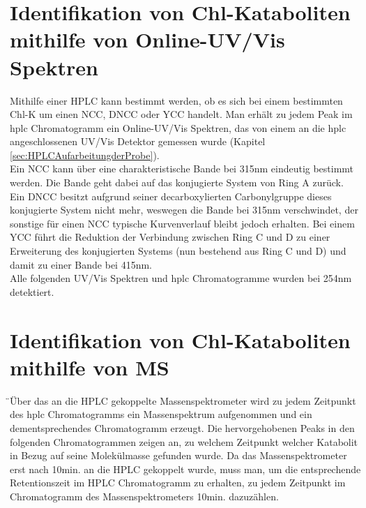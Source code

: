 \section{Identifikation von Chl-Kataboliten mithilfe von Online-UV/Vis Spektren} \label{sec:IdentifikationUVVis}

Mithilfe einer HPLC kann bestimmt werden, ob es sich bei einem bestimmten \gls{Chl-K} um einen \gls{NCC}, \gls{DNCC} oder \gls{YCC} handelt. Man erhält zu jedem Peak im \gls{hplc} Chromatogramm ein Online-UV/Vis Spektren, das von einem an die \gls{hplc} angeschlossenen UV/Vis Detektor gemessen wurde (Kapitel \ref{sec:HPLCAufarbeitungderProbe}). \\

Ein \gls{NCC} kann über eine charakteristische Bande bei 315nm eindeutig bestimmt werden. Die Bande geht dabei auf das konjugierte System von Ring A zurück. Ein \gls{DNCC} besitzt aufgrund seiner decarboxylierten Carbonylgruppe dieses konjugierte System nicht mehr, weswegen die Bande bei 315nm verschwindet, der sonstige für einen \gls{NCC} typische Kurvenverlauf bleibt jedoch erhalten. Bei einem \gls{YCC} führt die Reduktion der Verbindung zwischen Ring C und D zu einer Erweiterung des konjugierten Systems (nun bestehend aus Ring C und D) und damit zu einer Bande bei 415nm. \\

Alle folgenden UV/Vis Spektren und \gls{hplc} Chromatogramme wurden bei 254nm detektiert.

\section{Identifikation von Chl-Kataboliten mithilfe von MS} \label{sec:IdentifikationMS}

̈Über das an die HPLC gekoppelte Massenspektrometer wird zu jedem Zeitpunkt des \gls{hplc} Chromatogramms ein Massenspektrum aufgenommen und ein dementsprechendes Chromatogramm erzeugt. Die hervorgehobenen Peaks in den folgenden Chromatogrammen zeigen an, zu welchem Zeitpunkt welcher Katabolit in Bezug auf seine Molekülmasse gefunden wurde. Da das Massenspektrometer erst nach 10min. an die HPLC gekoppelt wurde, muss man, um die entsprechende Retentionszeit im HPLC Chromatogramm zu erhalten, zu jedem Zeitpunkt im Chromatogramm des Massenspektrometers 10min. dazuzählen.  \\

